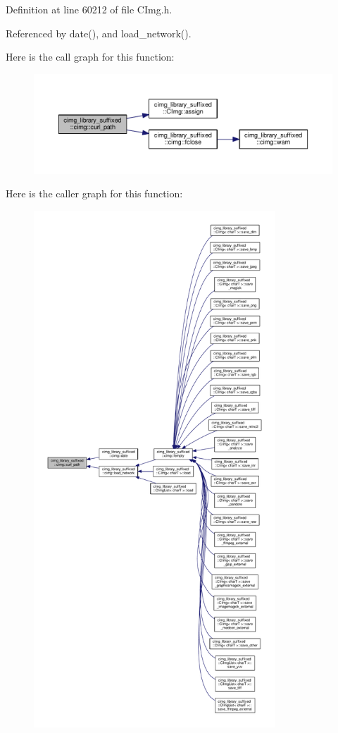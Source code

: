 Definition at line 60212 of file C\+Img.\+h.



Referenced by date(), and load\+\_\+network().

Here is the call graph for this function\+:
\nopagebreak
\begin{figure}[H]
\begin{center}
\leavevmode
\includegraphics[width=350pt]{d4/d9b/namespacecimg__library__suffixed_1_1cimg_aebd4f990c3e148573c96c04dbfdcc5c6_cgraph}
\end{center}
\end{figure}
Here is the caller graph for this function\+:
\nopagebreak
\begin{figure}[H]
\begin{center}
\leavevmode
\includegraphics[height=550pt]{d4/d9b/namespacecimg__library__suffixed_1_1cimg_aebd4f990c3e148573c96c04dbfdcc5c6_icgraph}
\end{center}
\end{figure}
